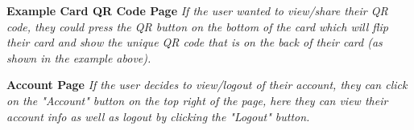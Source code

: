 \documentclass[12pt]{article}%
\begin{document}
\begin{center}
		\clearpage
	{\bf \Large Example Card QR Code Page}
	{\it If the user wanted to view/share their QR code, they could press the QR button on the bottom of the card which will flip their card and show the unique
	QR code that is on the back of their card (as shown in the example above).}
	
		\clearpage
	{\bf \Large Account Page}
	{\it If the user decides to view/logout of their account, they can click on the "Account" button on the top right of the page, here they can view their account
	info as well as logout by clicking the "Logout" button.}

\end{center}

\clearpage
\end{document}
